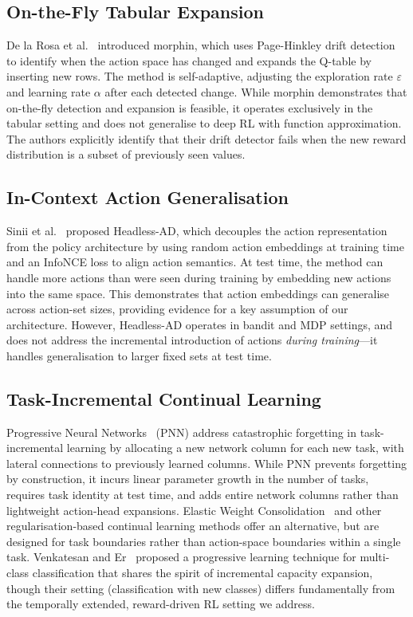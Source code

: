 \documentclass{article}
\begin{document}
\subsection{On-the-Fly Tabular Expansion}

De la Rosa et al.~\cite{delarosa2026morphin} introduced morphin, which uses
Page-Hinkley drift detection to identify when the action space has changed and
expands the Q-table by inserting new rows. The method is self-adaptive,
adjusting the exploration rate $\varepsilon$ and learning rate $\alpha$ after
each detected change. While morphin demonstrates that on-the-fly detection and
expansion is feasible, it operates exclusively in the tabular setting and does
not generalise to deep RL with function approximation. The authors explicitly
identify that their drift detector fails when the new reward distribution is a
subset of previously seen values.

\subsection{In-Context Action Generalisation}

Sinii et al.~\cite{sinii2023headless} proposed Headless-AD, which decouples
the action representation from the policy architecture by using random action
embeddings at training time and an InfoNCE loss to align action semantics. At
test time, the method can handle more actions than were seen during training by
embedding new actions into the same space. This demonstrates that action
embeddings can generalise across action-set sizes, providing evidence for a key
assumption of our architecture. However, Headless-AD operates in bandit and
MDP settings, and does not address the incremental introduction of actions
\emph{during training}---it handles generalisation to larger fixed sets at
test time.

\subsection{Task-Incremental Continual Learning}

Progressive Neural Networks~\cite{rusu2016progressive} (PNN) address
catastrophic forgetting in task-incremental learning by allocating a new
network column for each new task, with lateral connections to previously
learned columns. While PNN prevents forgetting by construction, it incurs
linear parameter growth in the number of tasks, requires task identity at test
time, and adds entire network columns rather than lightweight action-head
expansions. Elastic Weight Consolidation~\cite{kirkpatrick2017overcoming} and
other regularisation-based continual learning methods offer an alternative, but
are designed for task boundaries rather than action-space boundaries within a
single task. Venkatesan and Er~\cite{venkatesan2016progressive} proposed a
progressive learning technique for multi-class classification that shares the
spirit of incremental capacity expansion, though their setting (classification
with new classes) differs fundamentally from the temporally extended,
reward-driven RL setting we address.
\end{document}

